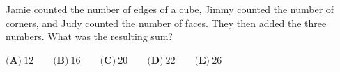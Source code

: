 Jamie counted the number of edges of a cube, Jimmy counted the number of corners, and Judy counted the number of faces. They then added the three numbers. What was the resulting sum?

$\textbf{(A)}\ 12 \qquad \textbf{(B)}\ 16 \qquad \textbf{(C)}\ 20\qquad \textbf{(D)}\ 22 \qquad \textbf{(E)}\ 26$
